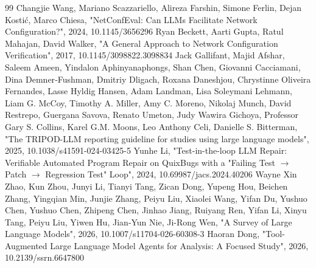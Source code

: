 \documentclass[conference]{IEEEtran}
\begin{document}
\begin{thebibliography}{99}
 Changjie Wang, Mariano Scazzariello, Alireza Farshin, Simone Ferlin, Dejan Kostić, Marco Chiesa, "NetConfEval: Can LLMs Facilitate Network Configuration?", 2024, 10.1145/3656296
 Ryan Beckett, Aarti Gupta, Ratul Mahajan, David Walker, "A General Approach to Network Configuration Verification", 2017, 10.1145/3098822.3098834
 Jack Gallifant, Majid Afshar, Saleem Ameen, Yindalon Aphinyanaphongs, Shan Chen, Giovanni Cacciamani, Dina Demner‐Fushman, Dmitriy Dligach, Roxana Daneshjou, Chrystinne Oliveira Fernandes, Lasse Hyldig Hansen, Adam Landman, Lisa Soleymani Lehmann, Liam G. McCoy, Timothy A. Miller, Amy C. Moreno, Nikolaj Munch, David Restrepo, Guergana Savova, Renato Umeton, Judy Wawira Gichoya, Professor Gary S. Collins, Karel G.M. Moons, Leo Anthony Celi, Danielle S. Bitterman, "The TRIPOD-LLM reporting guideline for studies using large language models", 2025, 10.1038/s41591-024-03425-5
 Yunhe Li, "Test-in-the-loop LLM Repair: Verifiable Automated Program Repair on QuixBugs with a "Failing Test \ensuremath{\rightarrow} Patch \ensuremath{\rightarrow} Regression Test" Loop", 2024, 10.69987/jacs.2024.40206
 Wayne Xin Zhao, Kun Zhou, Junyi Li, Tianyi Tang, Zican Dong, Yupeng Hou, Beichen Zhang, Yingqian Min, Junjie Zhang, Peiyu Liu, Xiaolei Wang, Yifan Du, Yushuo Chen, Yushuo Chen, Zhipeng Chen, Jinhao Jiang, Ruiyang Ren, Yifan Li, Xinyu Tang, Peiyu Liu, Yiwen Hu, Jian‐Yun Nie, Ji-Rong Wen, "A Survey of Large Language Models", 2026, 10.1007/s11704-026-60308-3
 Haoran Dong, "Tool-Augmented Large Language Model Agents for Analysis: A Focused Study", 2026, 10.2139/ssrn.6647800
\end{thebibliography}
\end{document}
